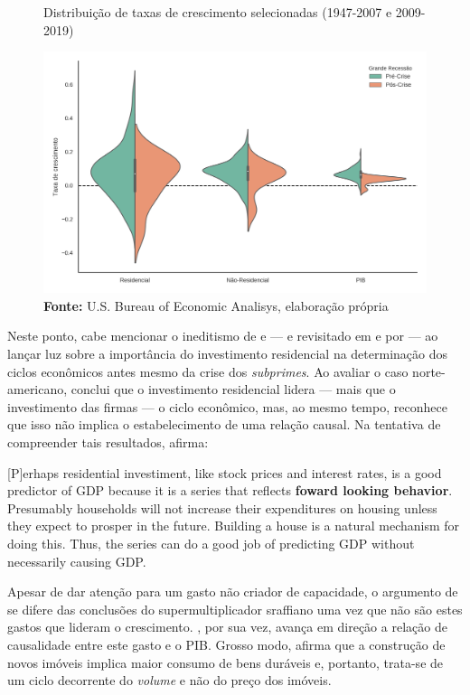 \begin{figure}[H]
	\centering
	\caption{Distribuição de taxas de crescimento selecionadas (1947-2007 e 2009-2019)}
	\label{FigVolatilidade}
	\includegraphics[width=\textwidth]{../../Dados/Fatos_Estilizados/figs/Volatilidade.png}
	\caption*{\textbf{Fonte:} U.S. Bureau of Economic Analisys, elaboração própria}
\end{figure}

Neste ponto, cabe mencionar o ineditismo de \textcite{green_follow_1997} e \textcite{leamer_housing_2007} --- e revisitado em \textcite{leamer_housing_2015} e por \textcite{fiebiger_trend_2017} --- ao lançar luz sobre a importância do investimento residencial na determinação dos ciclos econômicos antes mesmo da crise dos \textit{subprimes}. 
Ao avaliar o caso norte-americano, \textcite{green_follow_1997} conclui que o
investimento residencial lidera --- mais que o investimento das firmas --- o ciclo econômico, mas, ao mesmo tempo, reconhece que isso não implica o estabelecimento de uma relação causal. Na tentativa de compreender tais resultados, afirma:

\begin{citacao}
	
	[P]erhaps residential investiment, like stock prices and interest rates, is a good predictor of GDP because it is a series that reflects \textbf{foward looking behavior}. Presumably households will not increase their expenditures on housing unless they expect to prosper in the future. Building a house is a natural mechanism for doing this. Thus, the series can do a good job of predicting GDP without necessarily causing GDP.
	\cite[p.~267, grifos adicionados]{green_follow_1997}
\end{citacao}
Apesar de dar atenção para um gasto não criador de capacidade, o argumento de \textcite{green_follow_1997} se difere das conclusões do supermultiplicador sraffiano uma vez que não são estes gastos que lideram o crescimento.
\textcite{leamer_housing_2007}, por sua vez, avança em direção a relação de causalidade entre este gasto e o PIB. Grosso modo, afirma que a construção de novos imóveis implica maior consumo de bens duráveis e, portanto, trata-se de um ciclo decorrente do \textit{volume} e não do preço dos imóveis. 

